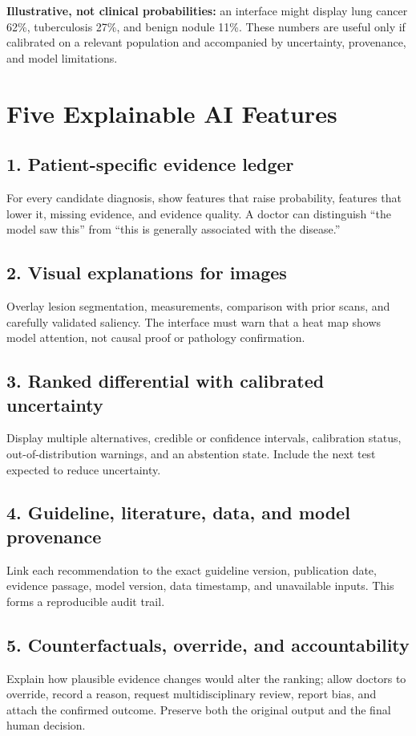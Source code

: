 \documentclass[11pt,a4paper]{article}
\begin{document}
\begin{keybox}
\textbf{Illustrative, not clinical probabilities:} an interface might display lung cancer 62\%, tuberculosis 27\%, and benign nodule 11\%. These numbers are useful only if calibrated on a relevant population and accompanied by uncertainty, provenance, and model limitations.
\end{keybox}

\section{Five Explainable AI Features}

\subsection{1. Patient-specific evidence ledger}
For every candidate diagnosis, show features that raise probability, features that lower it, missing evidence, and evidence quality. A doctor can distinguish ``the model saw this'' from ``this is generally associated with the disease.''

\subsection{2. Visual explanations for images}
Overlay lesion segmentation, measurements, comparison with prior scans, and carefully validated saliency. The interface must warn that a heat map shows model attention, not causal proof or pathology confirmation.

\subsection{3. Ranked differential with calibrated uncertainty}
Display multiple alternatives, credible or confidence intervals, calibration status, out-of-distribution warnings, and an abstention state. Include the next test expected to reduce uncertainty.

\subsection{4. Guideline, literature, data, and model provenance}
Link each recommendation to the exact guideline version, publication date, evidence passage, model version, data timestamp, and unavailable inputs. This forms a reproducible audit trail.

\subsection{5. Counterfactuals, override, and accountability}
Explain how plausible evidence changes would alter the ranking; allow doctors to override, record a reason, request multidisciplinary review, report bias, and attach the confirmed outcome. Preserve both the original output and the final human decision.
\end{document}

